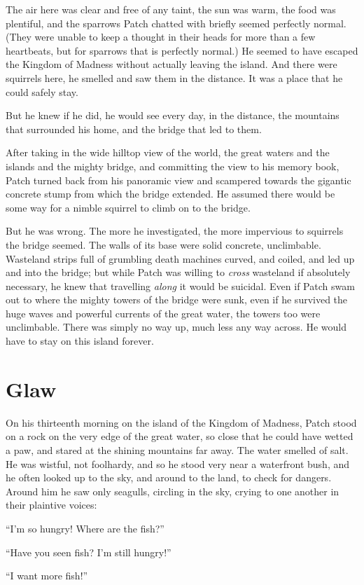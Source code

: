 \documentclass[ebook,oneside,openany,17pt]{memoir}
\renewcommand{\thechapter}{\Roman{chapter}}
\newcounter{sections}
\newcommand{\sections}[1]{%
  \section*{#1}
  \addtocounter{sections}{1}%
  \pdfbookmark[1]{#1}{section.\thechapter.\thesections}}
\begin{document}
The air here was clear and free of any taint, the sun was warm, the
food was plentiful, and the sparrows Patch chatted with briefly seemed
perfectly normal. (They were unable to keep a thought in their heads
for more than a few heartbeats, but for sparrows that is perfectly
normal.) He seemed to have escaped the Kingdom of Madness without
actually leaving the island. And there were squirrels here, he smelled
and saw them in the distance. It was a place that he could safely
stay.

But he knew if he did, he would see every day, in the distance, the
mountains that surrounded his home, and the bridge that led to them.

After taking in the wide hilltop view of the world, the great waters
and the islands and the mighty bridge, and committing the view to his
memory book, Patch turned back from his panoramic view and scampered
towards the gigantic concrete stump from which the bridge extended. He
assumed there would be some way for a nimble squirrel to climb on to
the bridge.

But he was wrong. The more he investigated, the more impervious to
squirrels the bridge seemed. The walls of its base were solid
concrete, unclimbable. Wasteland strips full of grumbling death
machines curved, and coiled, and led up and into the bridge; but while
Patch was willing to \emph{cross} wasteland if absolutely necessary,
he knew that travelling \emph{along} it would be suicidal. Even if
Patch swam out to where the mighty towers of the bridge were sunk,
even if he survived the huge waves and powerful currents of the great
water, the towers too were unclimbable. There was simply no way up,
much less any way across. He would have to stay on this island
forever.


\sections{Glaw}

On his thirteenth morning on the island of the Kingdom of Madness,
Patch stood on a rock on the very edge of the great water, so close
that he could have wetted a paw, and stared at the shining mountains
far away. The water smelled of salt. He was wistful, not foolhardy,
and so he stood very near a waterfront bush, and he often looked up to
the sky, and around to the land, to check for dangers. Around him he
saw only seagulls, circling in the sky, crying to one another in their
plaintive voices:

“I’m so hungry! Where are the fish?”

“Have you seen fish? I’m still hungry!”

“I want more fish!”
\end{document}
